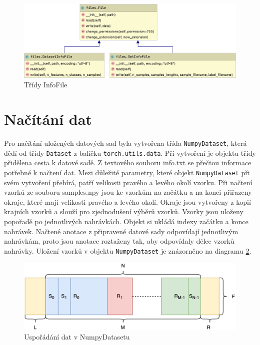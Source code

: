 \documentclass[FM,BP]{tulthesis}
\begin{document}
\begin{figure}[ht]
\centerline{\includegraphics[scale=.25]{files-info.png}}
\caption{Třídy InfoFile}
\label{fig:info_files}
\end{figure}
\FloatBarrier

\section{Načítání dat} %
Pro načítání uložených datových sad byla vytvořena třída \texttt{\mbox{NumpyDataset}}, která dědí od třídy \texttt{\mbox{Dataset}} z balíčku \texttt{\mbox{torch.utils.data}}. Při vytvoření je objektu třídy přidělena cesta k datové sadě. Z textového souboru info.txt se přečtou informace potřebné k načtení dat. Mezi důležité parametry, které objekt \texttt{\mbox{NumpyDataset}} při svém vytvoření přebírá, patří velikosti pravého a levého okolí vzorku. Při načtení vzorků ze souboru samples.npy jsou ke vzorkům na začátku a na konci přiřazeny okraje, které mají velikosti pravého a levého okolí. Okraje jsou vytvořeny z kopií krajních vzorků a slouží pro zjednodušení výběrů vzorků. Vzorky jsou uloženy popořadě po jednotlivých nahrávkách. Objekt si ukládá indexy začátku a konce nahrávek. Načtené anotace z připravené datové sady odpovídají jednotlivým nahrávkám, proto jsou anotace roztaženy tak, aby odpovídaly délce vzorků nahrávky. Uložení vzorků v objektu \texttt{\mbox{NumpyDataset}} je znázorněno na diagramu \mbox{\ref{fig:data_arrangement}}.

\begin{figure}[htbp]
\centerline{\includegraphics[scale=.125]{dataset_arrangement.png}}
\caption{Uspořádání dat v NumpyDatasetu}
\label{fig:data_arrangement}
\end{figure}
\FloatBarrier
\end{document}
